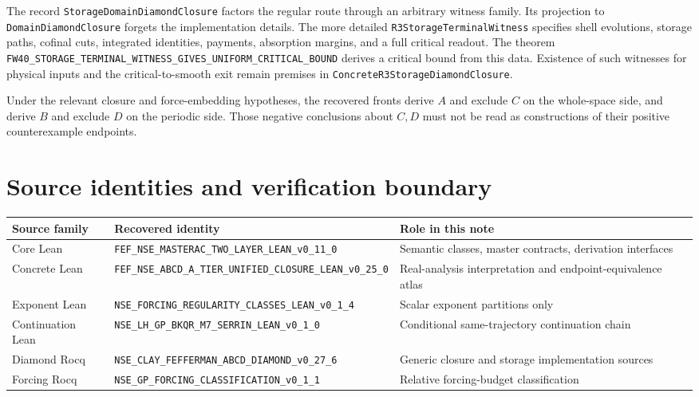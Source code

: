 \documentclass[11pt,a4paper]{article}
\theoremstyle{remark}\newtheorem{remark}[proposition]{Remark}
\newcommand{\code}[1]{\nolinkurl{#1}}
\begin{document}
The record \code{StorageDomainDiamondClosure} factors the regular route through an arbitrary witness family. Its projection to \code{DomainDiamondClosure} forgets the implementation details. The more detailed \code{R3StorageTerminalWitness} specifies shell evolutions, storage paths, cofinal cuts, integrated identities, payments, absorption margins, and a full critical readout. The theorem \code{FW40_STORAGE_TERMINAL_WITNESS_GIVES_UNIFORM_CRITICAL_BOUND} derives a critical bound from this data. Existence of such witnesses for physical inputs and the critical-to-smooth exit remain premises in \code{ConcreteR3StorageDiamondClosure}.

Under the relevant closure and force-embedding hypotheses, the recovered fronts derive $A$ and exclude $C$ on the whole-space side, and derive $B$ and exclude $D$ on the periodic side. Those negative conclusions about $C,D$ must not be read as constructions of their positive counterexample endpoints.

\section{Source identities and verification boundary}
\begin{center}\small
\begin{tabular}{p{.22\linewidth}p{.35\linewidth}p{.32\linewidth}}
\toprule
Source family & Recovered identity & Role in this note\\
\midrule
Core Lean & \code{FEF_NSE_MASTERAC_TWO_LAYER_LEAN_v0_11_0} & Semantic classes, master contracts, derivation interfaces\\
Concrete Lean & \code{FEF_NSE_ABCD_A_TIER_UNIFIED_CLOSURE_LEAN_v0_25_0} & Real-analysis interpretation and endpoint-equivalence atlas\\
Exponent Lean & \code{NSE_FORCING_REGULARITY_CLASSES_LEAN_v0_1_4} & Scalar exponent partitions only\\
Continuation Lean & \code{NSE_LH_GP_BKQR_M7_SERRIN_LEAN_v0_1_0} & Conditional same-trajectory continuation chain\\
Diamond Rocq & \code{NSE_CLAY_FEFFERMAN_ABCD_DIAMOND_v0_27_6} & Generic closure and storage implementation sources\\
Forcing Rocq & \code{NSE_GP_FORCING_CLASSIFICATION_v0_1_1} & Relative forcing-budget classification\\
\bottomrule
\end{tabular}
\end{center}
\end{document}
